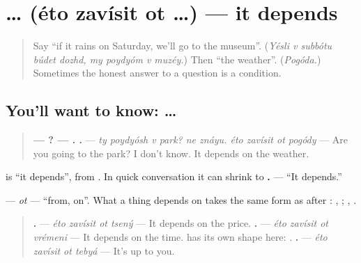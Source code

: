 \section[\texorpdfstring{\ru{это} \ru{зависит} \ru{от} … (éto zavísit ot …)}{это зависит от … (éto zavísit ot …)}]{   … (éto zavísit ot …) — it depends}

\label{lesson:RU-C269-zavisit}



\begin{quote}
Say \textquotedblleft{}if it rains on Saturday, we'll go to the museum\textquotedblright{}. (\emph{Yésli v subbótu búdet dozhd, my poydyóm v muzéy.}) Then \textquotedblleft{}the weather\textquotedblright{}. (\emph{Pogóda.}) Sometimes the honest answer to a question is a condition.
\end{quote}

\subsection*{You'll want to know:    …}
\begin{quote}
\textbf{—    ? —  .    .} — \emph{ty poydyósh v park? ne znáyu. éto zavísit ot pogódy} — Are you going to the park? I don't know. It depends on the weather.
\end{quote}

\textbf{} is \textquotedblleft{}it depends\textquotedblright{}, from \emph{}. In quick conversation it can shrink to \textbf{.} — \textquotedblleft{}It depends.\textquotedblright{}

\begin{grammarlens}[title={Grammar Lens: \ru{от} and the \textquotedblleft{}of\textquotedblright{} form}]
\textbf{} — \emph{ot} — \textquotedblleft{}from, on\textquotedblright{}. What a thing depends on takes the same form as after \emph{}: \emph{}, \textbf{ }; \emph{}, \textbf{ }.

\begin{quote}
\textbf{   .} — \emph{éto zavísit ot tsený} — It depends on the price. \textbf{   .} — \emph{éto zavísit ot vrémeni} — It depends on the time. \emph{} has its own shape here: \textbf{}. \textbf{   .} — \emph{éto zavísit ot tebyá} — It's up to you.
\end{quote}
\end{grammarlens}


